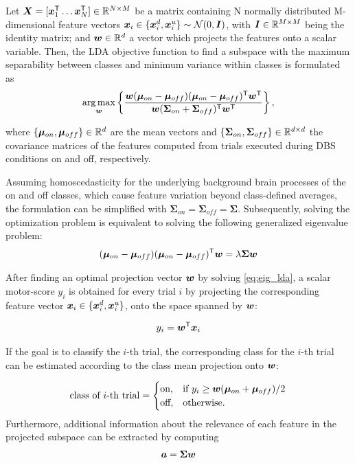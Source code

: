 \documentclass[10pt,a4paper, twocolumn]{article}
\providecommand{\mat}[1]{{\bm {#1}}}
\begin{document}
Let $\mat{X} = [\ve{x}^\T_1 \ldots \ve{x}^\T_N] \in \Real^{N\times M}$ be a matrix containing N normally distributed M-dimensional feature vectors $\ve{x}_i \in \{\ve{x}^d_i, \ve{x}^u_i\} \sim  \mathcal{N}(0,\mat{I})$, with $\mat{I} \in \Real ^{M\times M}$ being the identity matrix; and  ${\bm {w}} \in \mathbb{R}^d$ a vector which projects the features onto a scalar variable. Then, the LDA objective function to find a subspace with the maximum separability between classes and minimum variance within classes is formulated as
\begin{align*}
\argmax_\ve{w} \left\lbrace \frac{\ve{w}(\ve{\mu}_{on}-\ve{\mu}_{off})(\ve{\mu}_{on}-\ve{\mu}_{off})^\T\ve{w}^\T}{\ve{w}(\mat{\Sigma}_{on}+\mat{\Sigma}_{off})^\T\ve{w}^\T} \right\rbrace,
\end{align*}

where $ \{{\bm {\mu}}_{on},{\bm {\mu}}_{off}\} \in \mathbb{R}^{d}$ are the mean vectors and  $ \{\mat{\Sigma}_{on},\mat{\Sigma}_{off}\} \in \Real^{d\times d}$ the covariance matrices of the features computed from trials executed during DBS conditions on and off, respectively.

Assuming homoscedasticity for the underlying background brain processes of the on and off classes, which cause feature variation beyond class-defined averages, the formulation can be simplified with $\mat{\Sigma}_{on} = \mat{\Sigma}_{off} = \mat{\Sigma}$. Subsequently, solving the optimization problem is equivalent to solving the following generalized eigenvalue problem:
\begin{align}\label{eq:eig_lda}
(\ve{\mu}_{on}-\ve{\mu}_{off})(\ve{\mu}_{on}-\ve{\mu}_{off})^\T \ve{w} = \lambda\mat{\Sigma}\ve{w}
\end{align}

After finding an optimal projection vector ${\bm {w}}$ by solving \eqref{eq:eig_lda}, a scalar motor-score $y_i$ is obtained for every trial $i$ by projecting the corresponding feature vector ${\bm {x}}_i \in \{{\bm {x}}^d_i, {\bm {x}}^u_i\}$, onto the space spanned by ${\bm {w}}$:

\begin{align}\label{eq:score_projection}
y_i = {\bm {w}}^{\textsf{T}}{\bm {x}}_i
\end{align}

If the goal is to classify the $i$-th trial, the corresponding class for the $i$-th trial can be estimated according to the class mean projection onto ${\bm {w}}$:

\begin{align*}
\text{class of $i$-th trial}=\begin{cases}
\text{on}, & \text{if $y_i \geq \ve{w}(\ve{\mu}_{on}+\ve{\mu}_{off})/2$}\\
\text{off}, & \text{otherwise.}
\end{cases}
%
\end{align*}
Furthermore, additional information about the relevance of each feature in the projected subspace can be extracted by computing 
\begin{align}\label{eq:patterns}
\ve{a} = \mat{\Sigma}\ve{w}
\end{align}
\end{document}
